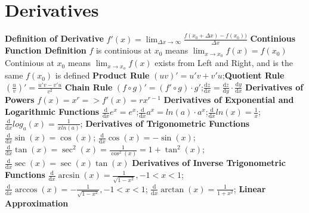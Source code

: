 \documentclass[twoside]{article}
\begin{document}
\section{Derivatives}
\textbf{Definition of Derivative}
$f'(x) = \lim_{\Delta x \to \infty} \frac{f(x_0 + \Delta x) - f(x_0))}{\Delta x}$ \newline
\textbf{Continious Function Definition} \newline
\indent $f$ is continious at $x_0$ means $\lim_{x \to x_0} f(x) = f(x_0)$ \newline
\indent Continious at $x_0$ means\newline
\indent \indent $\lim_{x \to x_o} f(x)$ exists from Left and Right, and is the same\newline
\indent \indent $f(x_0)$ is defined\newline
\noindent 
\textbf{Product Rule} $(uv)' = u'v + v'u$;\indent \textbf{Quotient Rule} $(\frac{u}{v})' = \frac{u'v - v'u}{v^2}$ \newline
\textbf{Chain Rule} $(f \circ g)' = (f' \circ g) \cdot g'$;\indent $\frac{\mathrm{d}z}{\mathrm{d}x} = \frac{\mathrm{d}z}{\mathrm{d}y} \cdot \frac{\mathrm{d}y}{\mathrm{d}x}$ \newline
\textbf{Derivatives of Powers} $f(x)=x^r => f'(x)=rx^{r-1} $ \newline
\textbf{Derivatives of Exponential and Logarithmic Functions} \newline
\indent $\frac{\mathrm{d}}{\mathrm{d}x}e^x = e^x$;\indent $\frac{\mathrm{d}}{\mathrm{d}x}a^x = ln(a) \cdot a^x$;\indent $\frac{\mathrm{d}}{\mathrm{d}x}ln(x) = \frac{1}{x}$; 
\indent $\frac{\mathrm{d}}{\mathrm{d}x}log_a(x) = \frac{1}{xln(a)}$; \newline
\textbf{Derivatives of Trigonometric Functions} \newline
\indent $\frac{\mathrm{d}}{\mathrm{d}x}\sin(x)=\cos(x)$; $\frac{\mathrm{d}}{\mathrm{d}x}\cos(x)=-\sin(x)$; $\frac{\mathrm{d}}{\mathrm{d}x}\tan(x)=\sec^2(x)=\frac{1}{\cos^2(x)}=1+\tan^2(x)$; $\frac{\mathrm{d}}{\mathrm{d}x}\sec(x)=\sec(x)\tan(x)$\newline
\textbf{Derivatives of Inverse Trigonometric Functions} \newline
\indent $\frac{\mathrm{d}}{\mathrm{d}x}\arcsin(x)=\frac{1}{\sqrt{1-x^2}}, -1<x<1$; 
\indent $\frac{\mathrm{d}}{\mathrm{d}x}\arccos(x)=-\frac{1}{\sqrt{1-x^2}}, -1<x<1$; 
\indent $\frac{\mathrm{d}}{\mathrm{d}x}\arctan(x)=\frac{1}{1+x^2}$;\newline
\textbf{Linear Approximation}\newline
\end{document}
